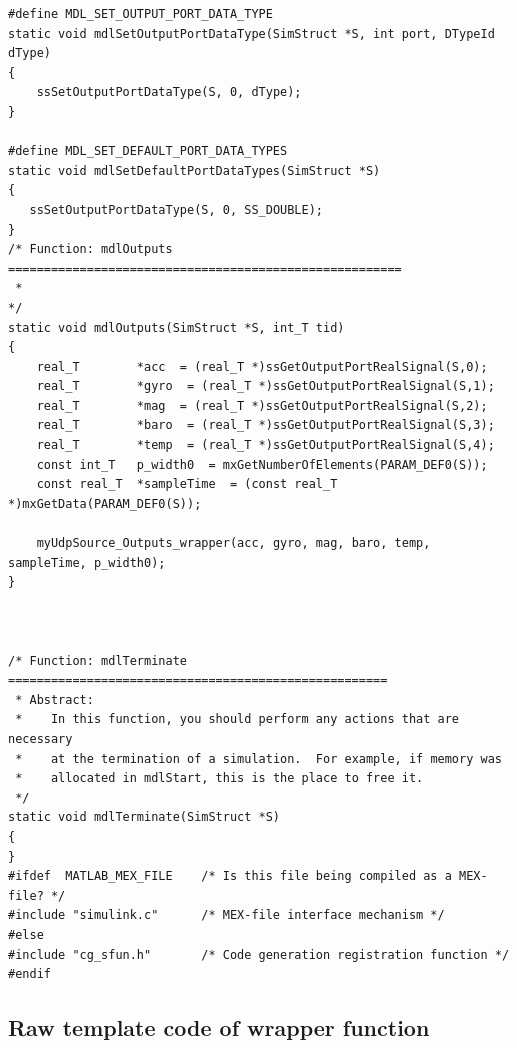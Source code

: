 \begin{lstlisting}
#define MDL_SET_OUTPUT_PORT_DATA_TYPE
static void mdlSetOutputPortDataType(SimStruct *S, int port, DTypeId dType)
{
    ssSetOutputPortDataType(S, 0, dType);
}

#define MDL_SET_DEFAULT_PORT_DATA_TYPES
static void mdlSetDefaultPortDataTypes(SimStruct *S)
{
   ssSetOutputPortDataType(S, 0, SS_DOUBLE);
}
/* Function: mdlOutputs =======================================================
 *
*/
static void mdlOutputs(SimStruct *S, int_T tid)
{
    real_T        *acc  = (real_T *)ssGetOutputPortRealSignal(S,0);
    real_T        *gyro  = (real_T *)ssGetOutputPortRealSignal(S,1);
    real_T        *mag  = (real_T *)ssGetOutputPortRealSignal(S,2);
    real_T        *baro  = (real_T *)ssGetOutputPortRealSignal(S,3);
    real_T        *temp  = (real_T *)ssGetOutputPortRealSignal(S,4);
    const int_T   p_width0  = mxGetNumberOfElements(PARAM_DEF0(S));
    const real_T  *sampleTime  = (const real_T *)mxGetData(PARAM_DEF0(S));

    myUdpSource_Outputs_wrapper(acc, gyro, mag, baro, temp, sampleTime, p_width0);
}



/* Function: mdlTerminate =====================================================
 * Abstract:
 *    In this function, you should perform any actions that are necessary
 *    at the termination of a simulation.  For example, if memory was
 *    allocated in mdlStart, this is the place to free it.
 */
static void mdlTerminate(SimStruct *S)
{
}
#ifdef  MATLAB_MEX_FILE    /* Is this file being compiled as a MEX-file? */
#include "simulink.c"      /* MEX-file interface mechanism */
#else
#include "cg_sfun.h"       /* Code generation registration function */
#endif
\end{lstlisting}

\newpage
\subsection{Raw template code of wrapper function}
\label{sec:c-sFunc-Code:wrapperOutputs}

